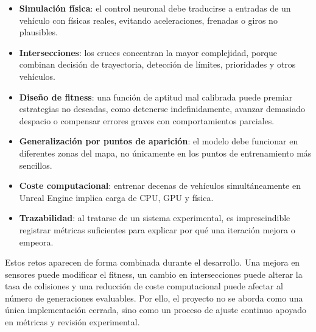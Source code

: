\begin{itemize}[leftmargin=*]
  \item \textbf{Simulación física}: el control neuronal debe traducirse a entradas de un vehículo con físicas reales, evitando aceleraciones, frenadas o giros no plausibles.
  \item \textbf{Intersecciones}: los cruces concentran la mayor complejidad, porque combinan decisión de trayectoria, detección de límites, prioridades y otros vehículos.
  \item \textbf{Diseño de fitness}: una función de aptitud mal calibrada puede premiar estrategias no deseadas, como detenerse indefinidamente, avanzar demasiado despacio o compensar errores graves con comportamientos parciales.
  \item \textbf{Generalización por puntos de aparición}: el modelo debe funcionar en diferentes zonas del mapa, no únicamente en los puntos de entrenamiento más sencillos.
  \item \textbf{Coste computacional}: entrenar decenas de vehículos simultáneamente en Unreal Engine implica carga de CPU, GPU y física.
  \item \textbf{Trazabilidad}: al tratarse de un sistema experimental, es imprescindible registrar métricas suficientes para explicar por qué una iteración mejora o empeora.
\end{itemize}

Estos retos aparecen de forma combinada durante el desarrollo. Una mejora en sensores puede modificar el fitness, un cambio en intersecciones puede alterar la tasa de colisiones y una reducción de coste computacional puede afectar al número de generaciones evaluables. Por ello, el proyecto no se aborda como una única implementación cerrada, sino como un proceso de ajuste continuo apoyado en métricas y revisión experimental.
